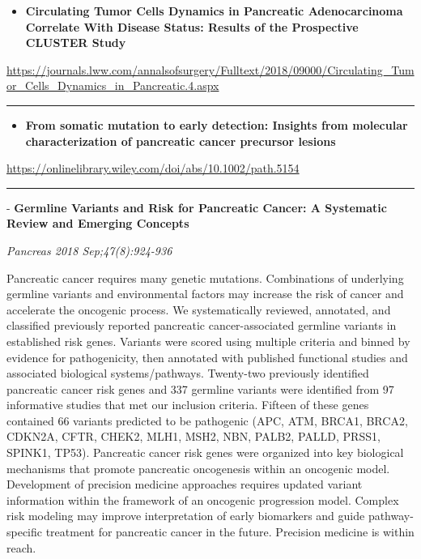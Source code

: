 \documentclass[]{article}
\providecommand{\tightlist}{%
  \setlength{\itemsep}{0pt}\setlength{\parskip}{0pt}}
\begin{document}
\begin{itemize}
\tightlist
\item
  \textbf{Circulating Tumor Cells Dynamics in Pancreatic Adenocarcinoma
  Correlate With Disease Status: Results of the Prospective CLUSTER
  Study}
\end{itemize}

\url{https://journals.lww.com/annalsofsurgery/Fulltext/2018/09000/Circulating_Tumor_Cells_Dynamics_in_Pancreatic.4.aspx}

\begin{center}\rule{0.5\linewidth}{\linethickness}\end{center}

\begin{itemize}
\tightlist
\item
  \textbf{From somatic mutation to early detection: Insights from
  molecular characterization of pancreatic cancer precursor lesions}
\end{itemize}

\url{https://onlinelibrary.wiley.com/doi/abs/10.1002/path.5154}

\begin{center}\rule{0.5\linewidth}{\linethickness}\end{center}

 - \textbf{Germline Variants and Risk for Pancreatic Cancer: A
Systematic Review and Emerging Concepts}

\emph{Pancreas 2018 Sep;47(8):924-936}

Pancreatic cancer requires many genetic mutations. Combinations of
underlying germline variants and environmental factors may increase the
risk of cancer and accelerate the oncogenic process. We systematically
reviewed, annotated, and classified previously reported pancreatic
cancer-associated germline variants in established risk genes. Variants
were scored using multiple criteria and binned by evidence for
pathogenicity, then annotated with published functional studies and
associated biological systems/pathways. Twenty-two previously identified
pancreatic cancer risk genes and 337 germline variants were identified
from 97 informative studies that met our inclusion criteria. Fifteen of
these genes contained 66 variants predicted to be pathogenic (APC, ATM,
BRCA1, BRCA2, CDKN2A, CFTR, CHEK2, MLH1, MSH2, NBN, PALB2, PALLD, PRSS1,
SPINK1, TP53). Pancreatic cancer risk genes were organized into key
biological mechanisms that promote pancreatic oncogenesis within an
oncogenic model. Development of precision medicine approaches requires
updated variant information within the framework of an oncogenic
progression model. Complex risk modeling may improve interpretation of
early biomarkers and guide pathway-specific treatment for pancreatic
cancer in the future. Precision medicine is within reach.
\end{document}
